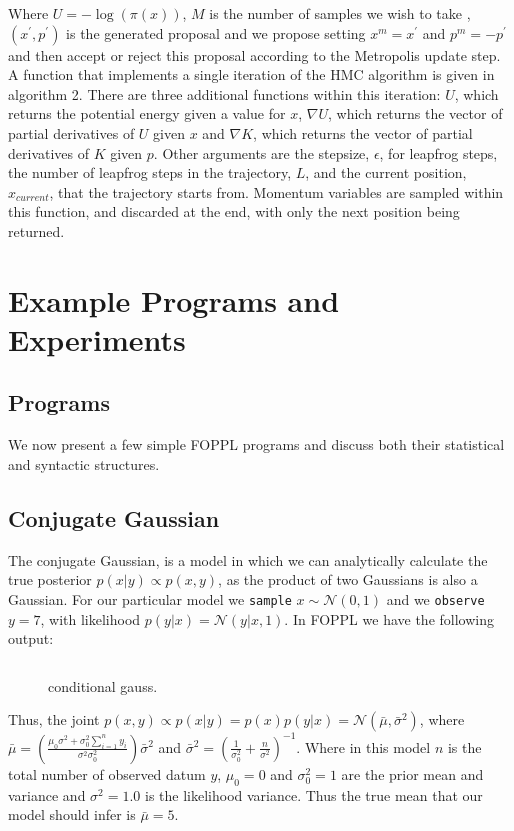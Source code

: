 \documentclass[twoside]{article}
\begin{document}
Where $U = -\log(\pi(x))$,  $M$ is the number of samples we wish to take , $(x^{'}, p^{'})$ is the generated proposal and we propose setting $x^{m} = x^{'}$ and $p^{m} = -p^{'}$ and then accept or reject this proposal according to the Metropolis update step. 
A function that implements a single iteration of the HMC algorithm is given in algorithm 2. There are three additional functions within this iteration: $U$, which returns the potential energy given a value for $x$,  $\nabla U$, which returns the vector of partial derivatives of $U$ given $x$ and $\nabla K$, which returns the vector of partial derivatives of $K$ given $p$. Other arguments are the stepsize, $\epsilon$, for leapfrog steps, the number of leapfrog steps in the trajectory, $L$, and the current position, $x_{current}$, that the trajectory starts from. Momentum variables are sampled within this function, and discarded at the end, with only the next position being returned. 

\section{Example Programs and Experiments}
\label{sec:exampprog}
\subsection{Programs}

We now present a few simple FOPPL programs and discuss both their statistical and syntactic structures. 

\subsection{Conjugate Gaussian}
The conjugate Gaussian, is a model in which we can analytically calculate the true posterior $p(x | y) \propto p(x,y) $, as the product of two Gaussians is also a Gaussian. For our particular model we \texttt{sample} $x \sim \mathcal{N}(0, 1)$ and we \texttt{observe} $y = 7$, with likelihood $p(y|x) = \mathcal{N}(y | x, 1)$.  In FOPPL we have the following output:
\inputminted{clojure}{code/conjugategauss.clj}
\begin{figure}[ht]
	\begin{center}
		
	\end{center}
	\caption{conditional gauss.}
\end{figure}
Thus, the joint $ p(x,y) \propto p(x|y) = p(x)p(y| x) = \mathcal{N}(\bar{\mu}, \bar{\sigma}^{2})$, where $\bar{\mu} = \left(\frac{\mu_{0}\sigma^{2} + \sigma^{2}_{0}\sum_{i=1}^{n}y_{i}}{\sigma^{2}\sigma^{2}_{0}}\right) \bar{\sigma}^{2}$ and $\bar{\sigma}^{2} = \left(\frac{1}{\sigma^{2}_{0}} + \frac{n}{\sigma^{2}}\right)^{-1} $. Where in this model $n$ is the total number of observed datum $y$, $\mu_{0} = 0 $ and $\sigma_{0}^{2} = 1$ are the prior mean and variance and $\sigma^{2} = 1.0 $ is the likelihood variance. Thus the true mean that our model should infer is $\bar{\mu} = 5$. 
\end{document}
